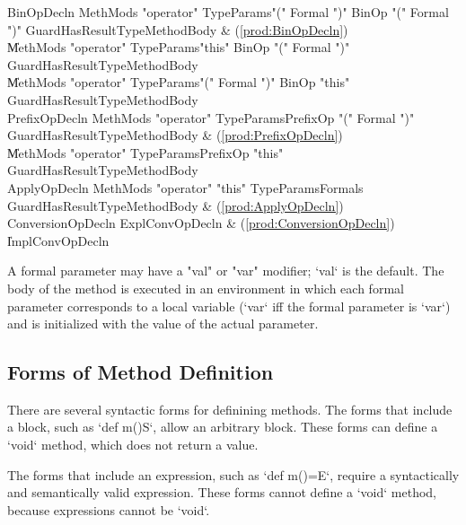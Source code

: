 \begin{bbgrammar}
          BinOpDecln \: MethMods \xcd"operator" TypeParams\opt \xcd"(" Formal  \xcd")" BinOp \xcd"(" Formal  \xcd")" Guard\opt HasResultType\opt MethodBody & (\ref{prod:BinOpDecln}) \\
                     \| MethMods \xcd"operator" TypeParams\opt \xcd"this" BinOp \xcd"(" Formal  \xcd")" Guard\opt HasResultType\opt MethodBody \\
                     \| MethMods \xcd"operator" TypeParams\opt \xcd"(" Formal  \xcd")" BinOp \xcd"this" Guard\opt HasResultType\opt MethodBody \\
       PrefixOpDecln \: MethMods \xcd"operator" TypeParams\opt PrefixOp \xcd"(" Formal  \xcd")" Guard\opt HasResultType\opt MethodBody & (\ref{prod:PrefixOpDecln}) \\
                     \| MethMods \xcd"operator" TypeParams\opt PrefixOp \xcd"this" Guard\opt HasResultType\opt MethodBody \\
        ApplyOpDecln \: MethMods \xcd"operator" \xcd"this" TypeParams\opt Formals Guard\opt HasResultType\opt MethodBody & (\ref{prod:ApplyOpDecln}) \\
   ConversionOpDecln \: ExplConvOpDecln & (\ref{prod:ConversionOpDecln}) \\
                     \| ImplConvOpDecln \\
\end{bbgrammar}


A formal parameter may have a \xcd"val" or \xcd"var"
modifier; \xcd`val` is the default.
The body of the method is executed in an environment in which 
each formal parameter corresponds to a local variable (\xcd`var` iff the
formal parameter is \xcd`var`)
and is initialized with the value of the actual parameter.

\subsection{Forms of Method Definition}

There are several syntactic forms for definining methods.   The forms that
include a block, such as \xcd`def m(){S}`, allow an arbitrary block.  These
forms can define a \xcd`void` method, which does not return a value. 

The
forms that include an expression, such as \xcd`def m()=E`, require a
syntactically and semantically valid expression.   These forms cannot define a
\xcd`void` method, because expressions cannot be \xcd`void`.  

